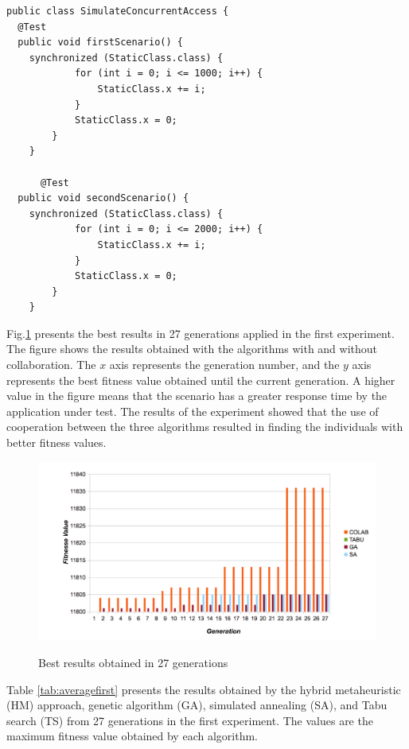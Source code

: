 \documentclass{report}
\begin{document}
\begin{lstlisting}[style=outline,caption={SimulateConcurrentAccess class},float,label=classsimulated]
public class SimulateConcurrentAccess {
  @Test
  public void firstScenario() {
    synchronized (StaticClass.class) {
			for (int i = 0; i <= 1000; i++) {
				StaticClass.x += i;
			}
			StaticClass.x = 0;
		}
	}

	  @Test
  public void secondScenario() {
    synchronized (StaticClass.class) {
			for (int i = 0; i <= 2000; i++) {
				StaticClass.x += i;
			}
			StaticClass.x = 0;
		}
	}
\end{lstlisting}


Fig.\ref{fig:exp1bestresults} presents the best results in 27 generations applied in the first experiment. The figure shows the results obtained with the algorithms with and without collaboration. The $x$ axis  represents the generation number, and the $y$ axis represents the best fitness value obtained until the current generation.
A higher value in the figure means that the scenario has a greater response time by the application under test. The results of the experiment showed that the use of cooperation between the three algorithms resulted in finding the individuals with better fitness values.

\begin{figure}[h]
\centering
\caption{Best results obtained in 27 generations}
\includegraphics[width=1\textwidth]{./images/generationcomparative.png}
\label{fig:exp1bestresults}
\end{figure}

Table \ref{tab:averagefirst} presents the results obtained by the hybrid metaheuristic (HM) approach, genetic algorithm (GA), simulated annealing (SA), and Tabu search (TS) from 27 generations in the first experiment. The values are the maximum fitness value obtained by each algorithm.
\end{document}
